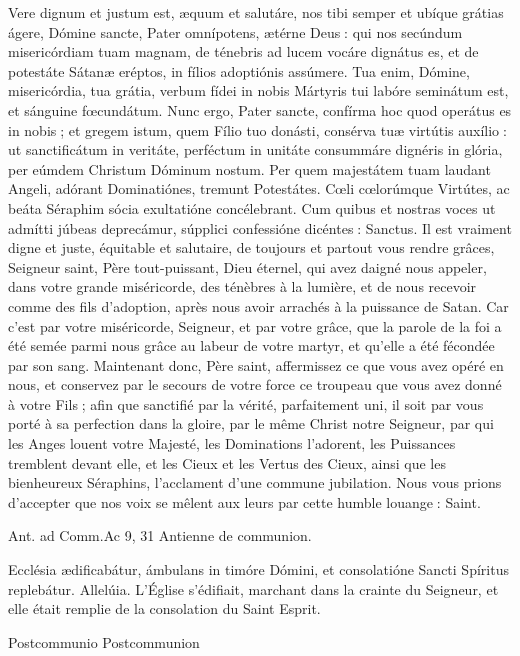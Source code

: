 \begin{paracol}{2}
Vere dignum et justum est, æquum et salutáre, nos tibi semper et ubíque grátias ágere, Dómine sancte, Pater omnípotens, ætérne Deus : qui nos secúndum misericórdiam tuam magnam, de ténebris ad lucem vocáre dignátus es, et de potestáte Sátanæ eréptos, in fílios adoptiónis assúmere. Tua enim, Dómine, misericórdia, tua grátia, verbum fídei in nobis Mártyris tui labóre seminátum est, et sánguine fœcundátum. Nunc ergo, Pater sancte, confírma hoc quod operátus es in nobis ; et gregem istum, quem Fílio tuo donásti, consérva tuæ virtútis auxílio : ut sanctificátum in veritáte, perféctum in unitáte consummáre dignéris in glória, per eúmdem Christum Dóminum nostum. Per quem majestátem tuam laudant Angeli, adórant Dominatiónes, tremunt Potestátes. Cœli cœlorúmque Virtútes, ac beáta Séraphim sócia exultatióne concélebrant. Cum quibus et nostras voces ut admítti júbeas deprecámur, súpplici confessióne dicéntes : Sanctus.
\switchcolumn
Il est vraiment digne et juste, équitable et salutaire, de toujours et partout vous rendre grâces, Seigneur saint, Père tout-puissant, Dieu éternel, qui avez daigné nous appeler, dans votre grande miséricorde, des ténèbres à la lumière, et de nous recevoir comme des fils d’adoption, après nous avoir arrachés à la puissance de Satan. Car c’est par votre miséricorde, Seigneur, et par votre grâce, que la parole de la foi a été semée parmi nous grâce au labeur de votre martyr, et qu’elle a été fécondée par son sang. Maintenant donc, Père saint, affermissez ce que vous avez opéré en nous, et conservez par le secours de votre force ce troupeau que vous avez donné à votre Fils ; afin que sanctifié par la vérité, parfaitement uni, il soit par vous porté à sa perfection dans la gloire, par le même Christ notre Seigneur, par qui les Anges louent votre Majesté, les Dominations l’adorent, les Puissances tremblent devant elle, et les Cieux et les Vertus des Cieux, ainsi que les bienheureux Séraphins, l’acclament d’une commune jubilation. Nous vous prions d’accepter que nos voix se mêlent aux leurs par cette humble louange : Saint.
\switchcolumn*

Ant. ad Comm.\hfill Ac 9, 31
\switchcolumn
Antienne de communion.
\switchcolumn*

Ecclésia ædificabátur, ámbulans in timóre Dómini, et consolatióne Sancti Spíritus replebátur. Allelúia.
\switchcolumn
L’Église s’édifiait, marchant dans la crainte du Seigneur, et elle était remplie de la consolation du Saint Esprit.
\switchcolumn*

Postcommunio
\switchcolumn
Postcommunion
\switchcolumn*


\end{paracol}
